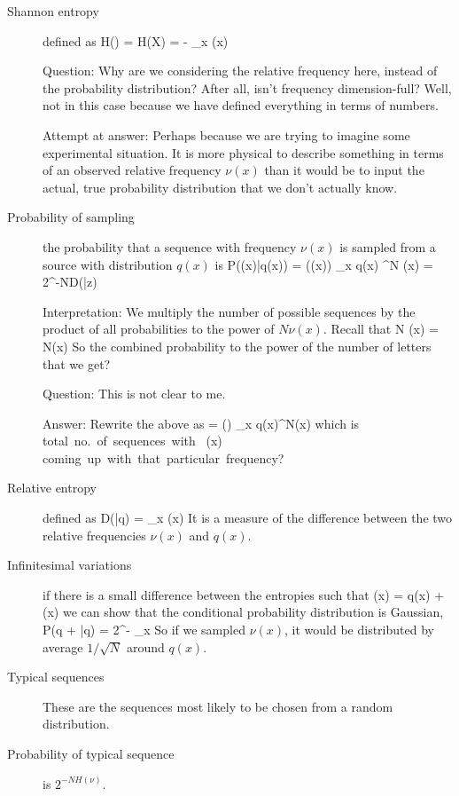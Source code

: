 \begin{description}
\item[Shannon entropy] defined as
\beq
H(\nu) = H(X) = - \sum_x \nu(x) 
\eeq

Question: Why are we considering the relative frequency here, instead of the probability distribution?  After all, isn't frequency dimension-full? Well, not in this case because we have defined everything in terms of numbers. 

Attempt at answer: Perhaps because we are trying to imagine some experimental situation. It is more physical to describe something in terms of an observed relative frequency $\nu(x)$ than it would be to input the actual, true probability distribution that we don't actually know. 

\item[Probability of sampling] the probability that a sequence with frequency $\nu(x)$ is sampled from a source with distribution $q(x)$ is
\beq
P(\nu(x)|q(x))  = \Omega(\nu(x)) \prod_x q(x) ^{N \nu(x)} = 2^{-ND(\nu|z)}
\eeq

Interpretation: We multiply the number of possible sequences by the product of all probabilities to the power of $N \nu(x)$. Recall that 
\beq
N \nu(x) = N(x)
\eeq
So the combined probability to the power of the number of letters that we get? 

Question: This is not clear to me. 

Answer: Rewrite the above as
\beq
 = \Omega(\nu) \prod_x q(x)^N(x)
 \eeq
 which is
 \beq
 \mbox{total no. of sequences with } \nu(x) \times \mbox{coming up with that particular frequency?
}
\eeq


\item[Relative entropy] defined as
\beq
D(\nu|q) = \sum_x \nu(x) 
\eeq
It is a measure of the difference between the two relative frequencies $\nu(x)$ and $q(x)$. 

\item[Infinitesimal variations] if there is a small difference between the entropies such that
\beq
\nu(x) = q(x) + \delta(x)
\eeq
we can show that the conditional probability distribution is Gaussian, 
\beq
P(q + \delta|q) = 2^{-  \sum_x }
\eeq
So if we sampled $\nu(x)$, it would be distributed by average $1/\sqrt{N}$ around $q(x)$. 

\item[Typical sequences] These are the sequences most likely to be chosen from a random distribution. 

\item[Probability of typical sequence] is $2^{- NH(\nu)}$. 

\end{description}

